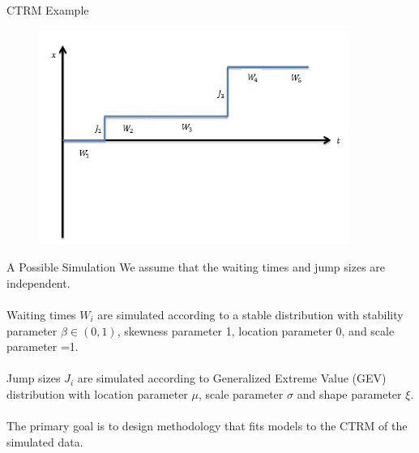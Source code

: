 \documentclass{beamer}
\begin{document}
\begin{frame}{CTRM Example}
    \begin{figure}
        \centering
        \includegraphics[scale=1]{CTRM.png}
    \end{figure}
\end{frame}

\begin{frame}{ A Possible Simulation }
	We assume that the waiting times and jump sizes are independent.
	\\~\\
	Waiting times $W_i$ are simulated according to a stable distribution with stability parameter $\beta \in (0,1)$, skewness parameter 1, location parameter 0, and scale parameter =1.
	\\~\\
	Jump sizes $J_i$ are simulated according to Generalized Extreme Value (GEV) distribution with location parameter $\mu$, scale parameter $\sigma$ and shape parameter $\xi$.
	\\~\\
	The primary goal is to design methodology that fits models to the CTRM of the simulated data.
\end{frame}
\end{document}

